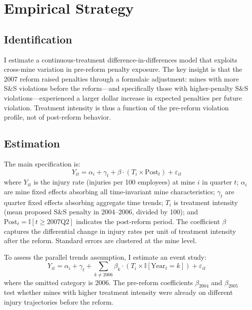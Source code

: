 \documentclass[12pt]{article}
\newcommand{\ind}{\mathbb{I}}
\begin{document}
\section{Empirical Strategy}

\subsection{Identification}

I estimate a continuous-treatment difference-in-differences model that exploits cross-mine variation in pre-reform penalty exposure. The key insight is that the 2007 reform raised penalties through a formulaic adjustment: mines with more S\&S violations before the reform---and specifically those with higher-penalty S\&S violations---experienced a larger dollar increase in expected penalties per future violation. Treatment intensity is thus a function of the pre-reform violation profile, not of post-reform behavior.

\subsection{Estimation}

The main specification is:
\begin{equation}
Y_{it} = \alpha_i + \gamma_t + \beta \cdot (T_i \times \text{Post}_t) + \varepsilon_{it}
\label{eq:did}
\end{equation}
where $Y_{it}$ is the injury rate (injuries per 100 employees) at mine $i$ in quarter $t$; $\alpha_i$ are mine fixed effects absorbing all time-invariant mine characteristics; $\gamma_t$ are quarter fixed effects absorbing aggregate time trends; $T_i$ is treatment intensity (mean proposed S\&S penalty in 2004--2006, divided by 100); and $\text{Post}_t = \ind[t \geq \text{2007Q2}]$ indicates the post-reform period. The coefficient $\beta$ captures the differential change in injury rates per unit of treatment intensity after the reform. Standard errors are clustered at the mine level.

To assess the parallel trends assumption, I estimate an event study:
\begin{equation}
Y_{it} = \alpha_i + \gamma_t + \sum_{k \neq 2006} \beta_k \cdot (T_i \times \ind[\text{Year}_t = k]) + \varepsilon_{it}
\label{eq:eventstudy}
\end{equation}
where the omitted category is 2006. The pre-reform coefficients $\beta_{2004}$ and $\beta_{2005}$ test whether mines with higher treatment intensity were already on different injury trajectories before the reform.
\end{document}
